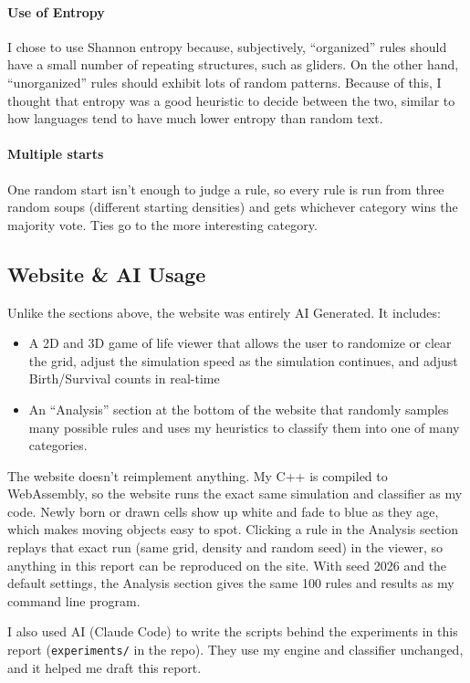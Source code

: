 \documentclass{article}
\begin{document}
\paragraph{Use of Entropy}
I chose to use Shannon entropy because, subjectively, ``organized'' rules should have a small number of repeating structures, such as gliders. On the other hand, ``unorganized'' rules should exhibit lots of random patterns. Because of this, I thought that entropy was a good heuristic to decide between the two, similar to how languages tend to have much lower entropy than random text.
\paragraph{Multiple starts}
One random start isn't enough to judge a rule, so every rule is run from three random soups (different starting densities) and gets whichever category wins the majority vote. Ties go to the more interesting category.
\subsection{Website \& AI Usage}
Unlike the sections above, the website was entirely AI Generated. It includes:
\begin{itemize}
    \item A 2D and 3D game of life viewer that allows the user to randomize or clear the grid, adjust the simulation speed as the simulation continues, and adjust Birth/Survival counts in real-time
    \item An ``Analysis'' section at the bottom of the website that randomly samples many possible rules and uses my heuristics to classify them into one of many categories.
\end{itemize}
The website doesn't reimplement anything. My C++ is compiled to WebAssembly, so the website runs the exact same simulation and classifier as my code. Newly born or drawn cells show up white and fade to blue as they age, which makes moving objects easy to spot. Clicking a rule in the Analysis section replays that exact run (same grid, density and random seed) in the viewer, so anything in this report can be reproduced on the site. With seed 2026 and the default settings, the Analysis section gives the same 100 rules and results as my command line program.

I also used AI (Claude Code) to write the scripts behind the experiments in this report (\verb|experiments/| in the repo). They use my engine and classifier unchanged, and it helped me draft this report.
\end{document}
